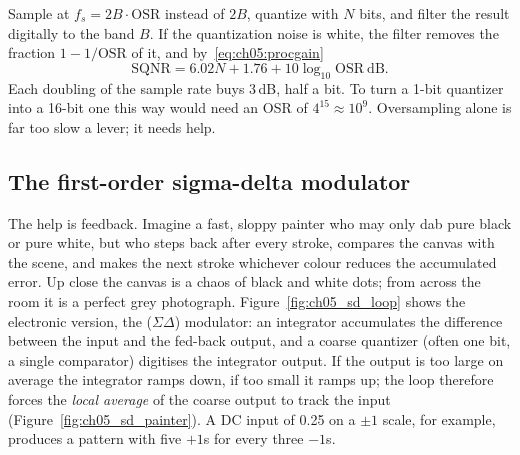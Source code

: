 Sample at $f_s=2B\cdot\mathrm{OSR}$ instead of $2B$, quantize with $N$ bits, and filter the
result digitally to the band $B$. If the quantization noise is white, the filter removes the
fraction $1-1/\mathrm{OSR}$ of it, and by~\eqref{eq:ch05:procgain}
\begin{equation}
\text{SQNR}=6.02N+1.76+10\log_{10}\mathrm{OSR}\ \text{dB}.
\end{equation}
Each doubling of the sample rate buys 3\,dB, half a bit. To turn a 1-bit quantizer into a
16-bit one this way would need an OSR of $4^{15}\approx10^9$. Oversampling alone is far too
slow a lever; it needs help.


\subsection{The first-order sigma-delta modulator}

The help is feedback. Imagine a fast, sloppy painter who may only dab pure black or pure white,
but who steps back after every stroke, compares the canvas with the scene, and makes the next
stroke whichever colour reduces the accumulated error. Up close the canvas is a chaos of black and
white dots; from across the room it is a perfect grey photograph. Figure~\ref{fig:ch05_sd_loop}
shows the electronic version, the  ($\Sigma\Delta$) modulator: an integrator
accumulates the difference between the input and the fed-back output, and a coarse quantizer
(often one bit, a single comparator) digitises the integrator output. If the output is too large
on average the integrator ramps down, if too small it ramps up; the loop therefore forces the
\emph{local average} of the coarse output to track the input (Figure~\ref{fig:ch05_sd_painter}).
A DC input of 0.25 on a $\pm1$ scale, for example, produces a pattern with five $+1$s for every
three $-1$s.

